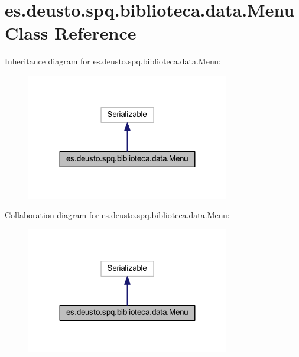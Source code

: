\hypertarget{classes_1_1deusto_1_1spq_1_1biblioteca_1_1data_1_1_menu}{}\section{es.\+deusto.\+spq.\+biblioteca.\+data.\+Menu Class Reference}
\label{classes_1_1deusto_1_1spq_1_1biblioteca_1_1data_1_1_menu}


Inheritance diagram for es.\+deusto.\+spq.\+biblioteca.\+data.\+Menu\+:
\nopagebreak
\begin{figure}[H]
\begin{center}
\leavevmode
\includegraphics[width=251pt]{classes_1_1deusto_1_1spq_1_1biblioteca_1_1data_1_1_menu__inherit__graph}
\end{center}
\end{figure}


Collaboration diagram for es.\+deusto.\+spq.\+biblioteca.\+data.\+Menu\+:
\nopagebreak
\begin{figure}[H]
\begin{center}
\leavevmode
\includegraphics[width=251pt]{classes_1_1deusto_1_1spq_1_1biblioteca_1_1data_1_1_menu__coll__graph}
\end{center}
\end{figure}

